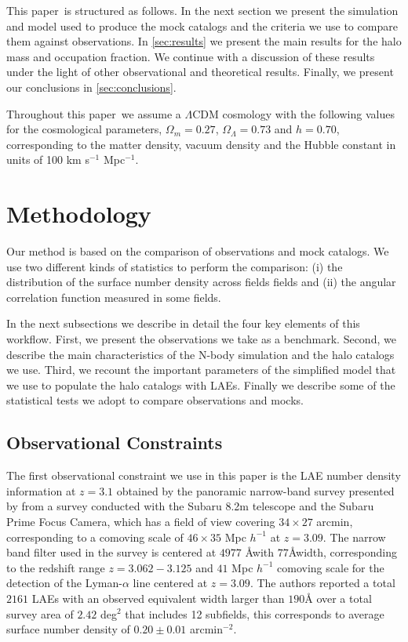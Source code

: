 \documentclass[usenatbib]{mn2e}
\newcommand{\documentname}{paper~}
\begin{document}
This \documentname is structured as follows. In the next section we present
the simulation and model used to produce the mock catalogs and the criteria
we use to compare them against observations. In \SS \ref{sec:results} we
present the main results for the halo mass and occupation fraction. We
continue with a discussion of these results under the light of other
observational and theoretical results. Finally, we present our
conclusions in \SS
\ref{sec:conclusions}. 

Throughout this \documentname we assume a $\Lambda$CDM cosmology with the
following values for the cosmological parameters, $\Omega_{m}=0.27$,
$\Omega_{\Lambda}=0.73$ and $h=0.70$, corresponding to the matter
density, vacuum density and the Hubble constant in units of 100 km
s$^{-1}$ Mpc$^{-1}$. 

\section{Methodology}

Our method is based on the comparison of observations and mock
catalogs. We use two different kinds of statistics to perform the
comparison: (i) the distribution of the surface number density
across fields fields and (ii) the angular correlation function measured in
some fields.

In the next subsections we describe in detail the four key
elements of this workflow. First, we present the observations we take
as a benchmark. Second, we describe the main characteristics of the
N-body simulation and the halo catalogs we use. Third, we recount the
important parameters of the simplified model that we use to populate
the halo catalogs with LAEs. Finally we describe some of the
statistical tests we adopt to compare observations and mocks.

\subsection{Observational Constraints}

The first observational constraint we use in this paper is the LAE number
density information at $z=3.1$ obtained by the panoramic narrow-band
survey presented by \cite{Yamada2012} from a survey
conducted with the Subaru 8.2m telescope and the Subaru Prime Focus Camera,
which has a field of view covering $34\times 27$ arcmin, corresponding to a
comoving scale of $46\times35$ Mpc $h^{-1}$ at $z=3.09$.  The narrow
band filter used in the survey is centered at $4977$ \AA with  $77$\AA width,
corresponding to the redshift range $z=3.062-3.125$ and $41$ Mpc
$h^{-1}$ comoving scale for the detection of the Lyman-$\alpha$ line
centered at $z=3.09$. The authors reported a
total  $2161$  LAEs with an observed equivalent width larger than $190$\AA 
over a total survey area of $2.42$ deg$^{2}$ that includes 12 subfields, 
this corresponds to average surface number density of $0.20\pm 0.01$
arcmin$^{-2}$.    
\end{document}
